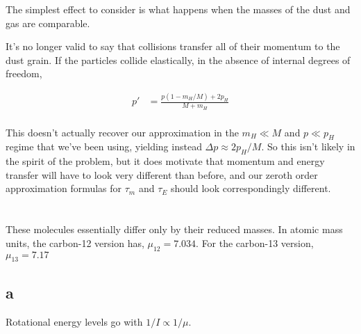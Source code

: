 \documentclass[12pt]{article}
\begin{document}
The simplest effect to consider is what happens when the masses of the dust and gas are comparable.

It's no longer valid to say that collisions transfer all of their momentum to the dust grain. If the particles collide elastically, in the absence of internal degrees of freedom,

\begin{align*}
p' &= \frac{p(1-m_H/M)+2p_H}{M+m_H} \\[11pt]
\end{align*}

This doesn't actually recover our approximation in the \(m_H \ll M\) and \(p \ll p_H\) regime that we've been using, yielding instead \(\Delta p \approx 2p_H/M \). So this isn't likely in the spirit of the problem, but it does motivate that momentum and energy transfer will have to look very different than before, and our zeroth order approximation formulas for \(\tau_m\) and \(\tau_E\) should look correspondingly different.


\section{}

These molecules essentially differ only by their reduced masses. In atomic mass units, the carbon-12 version has, \(\mu_{12} = 7.034\). For the carbon-13 version, \(\mu_{13} = 7.17\)

\subsection*{a}

Rotational energy levels go with \(1/I \propto 1/\mu\).  
\end{document}
